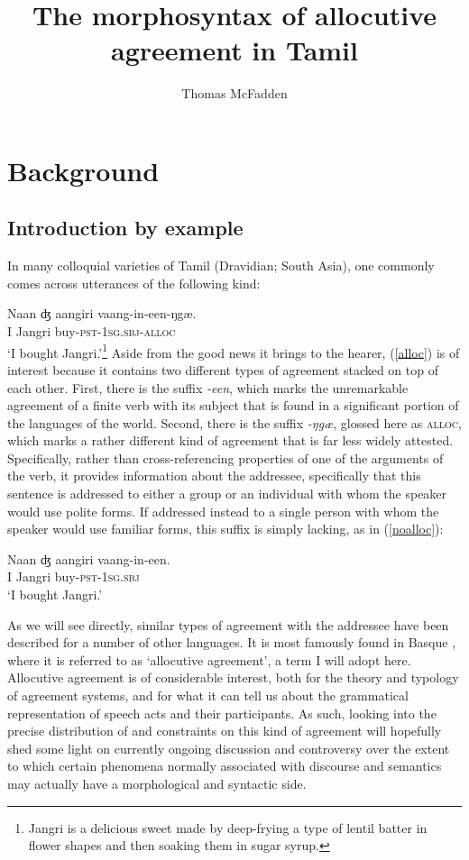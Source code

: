 \documentclass[output=paper, modfonts, nonflat]{langsci/langscibook}
\title{The morphosyntax of allocutive agreement in Tamil}
\author{ Thomas McFadden\affiliation{Leibniz-Zentrum Allgemeine Sprachwissenschaft}}
\begin{document}
\maketitle


\section{Background}

\subsection{Introduction by example}

In many colloquial varieties of Tamil (Dravidian; South Asia), one
commonly comes across utterances of the following kind:

\ea\label{alloc}
\gll Naan ʤ aangiri vaang-in-een-ŋgæ.\\
I Jangri buy-\textsc{pst}{}-1\textsc{sg.sbj}-\textsc{alloc}\\
\glt `I bought Jangri.'\footnote{Jangri is a delicious sweet made by
  deep-frying a type of lentil batter in flower shapes and then
  soaking them in sugar syrup.} 
\z 
%
Aside from the good news it brings to the hearer, (\ref{alloc}) is of
interest because it contains two different types of agreement stacked
on top of each other. First, there is the suffix \textit{-een}, which
marks the unremarkable agreement of a finite verb with its subject
that is found in a significant portion of the languages of the
world. Second, there is the suffix \textit{-ŋgæ}, glossed here as
\textsc{alloc}, which marks a rather different kind of agreement that
is far less widely attested. Specifically, rather than
cross-referencing properties of one of the arguments of the verb, it
provides information about the addressee, specifically that this
sentence is addressed to either a group or an individual with whom the
speaker would use polite forms. If addressed instead to a single
person with whom the speaker would use familiar forms, this suffix is
simply lacking, as in (\ref{noalloc}):

\ea\label{noalloc}
\gll Naan ʤ aangiri vaang-in-een.\\
I Jangri buy-\textsc{pst}{}-1\textsc{sg.sbj}\\
\glt `I bought Jangri.'
\z 

\noindent As we will see directly, similar types of agreement with the addressee
have been described for a number of other languages. It is most
famously found in Basque \citep{oyharcabal:1993}, where it is referred
to as `allocutive agreement', a term I will adopt here. Allocutive
agreement is of considerable interest, both for the theory and
typology of agreement systems, and for what it can tell us about the
grammatical representation of speech acts and their participants. As
such, looking into the precise distribution of and constraints on this
kind of agreement will hopefully shed some light on currently ongoing
discussion and controversy over the extent to which certain phenomena
normally associated with discourse and semantics may actually have a
morphological and syntactic side.
\end{document}
